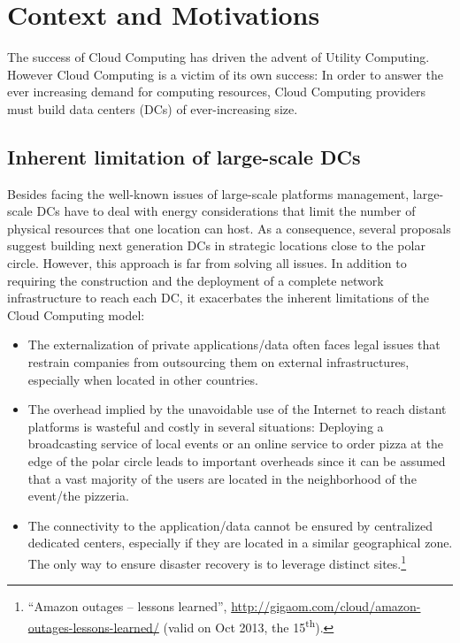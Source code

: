 \section{Context and Motivations}
\label{sec:intro}
The success of Cloud Computing has driven the advent of Utility Computing.
However Cloud Computing is a victim of its own success: In order to answer the
ever increasing demand for computing resources, Cloud Computing providers must
build data centers (DCs) of ever-increasing size. 


\subsection{Inherent limitation of large-scale DCs}


Besides facing the well-known
issues of large-scale platforms management, large-scale DCs have to deal with
energy considerations that limit the number of physical resources that one
location can host. As a consequence, several proposals suggest building next
generation DCs in strategic locations close to the polar circle. However, this
approach is far from solving all issues. In addition to requiring the
construction and the deployment of a complete network infrastructure to reach
each DC, it exacerbates the inherent limitations of the Cloud Computing model:

\begin{itemize}
\item The externalization of private applications/data often faces legal issues
that restrain companies from outsourcing them on external infrastructures,
especially when located in other countries. 
\item The overhead implied by the unavoidable use of the Internet to reach
distant platforms is wasteful and costly in several situations: Deploying a
broadcasting service of local events or an online service to order pizza at the
edge of the polar circle leads to important overheads since it can be assumed
that a vast majority of the users are located in the neighborhood of the
event/the pizzeria.  
\item The connectivity to the application/data cannot be ensured by centralized
dedicated centers, especially if they are located in a similar geographical
zone. The only way to ensure disaster recovery is to leverage distinct
sites.\footnote{“Amazon outages – lessons learned”,
\href{http://gigaom.com/cloud/amazon-outages-lessons-learned/}{http://gigaom.com/cloud/amazon-outages-lessons-learned/}
(valid on Oct 2013, the 15\textsuperscript{th}).} 
\end{itemize}

